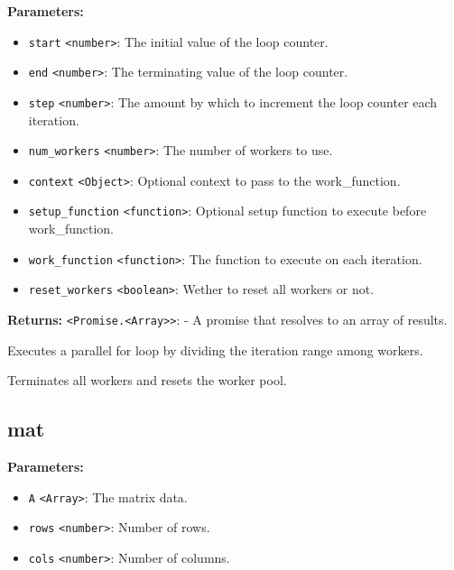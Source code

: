 \documentclass[12pt,a4paper]{article}
\begin{document}
\noindent \textbf{Parameters:}
\begin{itemize}
  \item \texttt{start} \texttt{<number>}: The initial value of the loop counter.
  \item \texttt{end} \texttt{<number>}: The terminating value of the loop counter.
  \item \texttt{step} \texttt{<number>}: The amount by which to increment the loop counter each iteration.
  \item \texttt{num\_workers} \texttt{<number>}: The number of workers to use.
  \item \texttt{context} \texttt{<Object>}: Optional context to pass to the work\_function.
  \item \texttt{setup\_function} \texttt{<function>}: Optional setup function to execute before work\_function.
  \item \texttt{work\_function} \texttt{<function>}: The function to execute on each iteration.
  \item \texttt{reset\_workers} \texttt{<boolean>}: Wether to reset all workers or not.
\end{itemize}

\noindent \textbf{Returns:} \texttt{<Promise.<Array>>}: - A promise that resolves to an array of results.

\noindent Executes a parallel for loop by dividing the iteration range among workers.

\vspace{5mm}
\noindent {}


\noindent Terminates all workers and resets the worker pool.


\subsection{mat}
\vspace{5mm}
\noindent {}


\noindent \textbf{Parameters:}
\begin{itemize}
  \item \texttt{A} \texttt{<Array>}: The matrix data.
  \item \texttt{rows} \texttt{<number>}: Number of rows.
  \item \texttt{cols} \texttt{<number>}: Number of columns.
\end{itemize}
\end{document}
